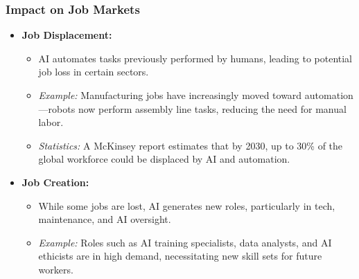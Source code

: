 \documentclass[aspectratio=169]{beamer}
\begin{document}
\begin{frame}[fragile]
    \frametitle{Impact on Job Markets}
    \begin{itemize}
        \item \textbf{Job Displacement:}
            \begin{itemize}
                \item AI automates tasks previously performed by humans, leading to potential job loss in certain sectors.
                \item \textit{Example:} Manufacturing jobs have increasingly moved toward automation—robots now perform assembly line tasks, reducing the need for manual labor.
                \item \textit{Statistics:} A McKinsey report estimates that by 2030, up to 30\% of the global workforce could be displaced by AI and automation.
            \end{itemize}
        \item \textbf{Job Creation:}
            \begin{itemize}
                \item While some jobs are lost, AI generates new roles, particularly in tech, maintenance, and AI oversight.
                \item \textit{Example:} Roles such as AI training specialists, data analysts, and AI ethicists are in high demand, necessitating new skill sets for future workers.
            \end{itemize}
    \end{itemize}
\end{frame}
\end{document}
